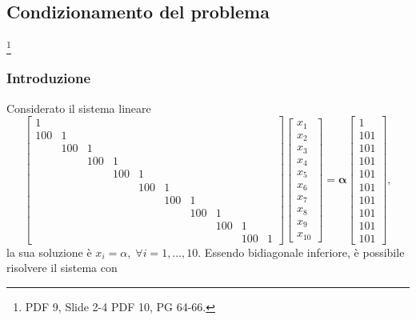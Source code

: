 \subsection{Condizionamento del problema}\footnote{PDF 9, Slide 2-4 PDF 10, PG 64-66.}
\subsubsection{Introduzione}
Considerato il sistema lineare
\begin{equation}\label{eq:sistema_lineare_bidiagonale}
    \begin{bmatrix}
        1\\
        100 & 1\\
        & 100 & 1\\
        & & 100 & 1\\
        & & & 100 & 1\\
        & & & & 100 & 1\\
        & & & & & 100 & 1\\
        & & & & & & 100 & 1\\
        & & & & & & & 100 & 1\\
        & & & & & & & & 100 & 1
    \end{bmatrix}\begin{bmatrix}
        x_1\\
        x_2\\
        x_3\\
        x_4\\
        x_5\\
        x_6\\
        x_7\\
        x_8\\
        x_9\\
        x_{10}
    \end{bmatrix} = 
    \boldsymbol\alpha\begin{bmatrix}
        1\\
        101\\
        101\\
        101\\
        101\\
        101\\
        101\\
        101\\
        101\\
        101
    \end{bmatrix},
\end{equation}
la sua soluzione è $x_i=\alpha,\; \forall i = 1, \hdots, 10$. Essendo bidiagonale inferiore, è possibile risolvere il sistema con

